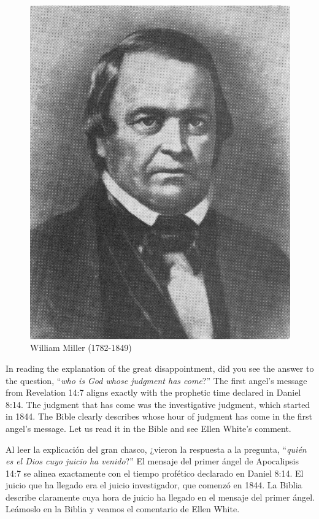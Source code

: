 \begin{figure}[hp]
    \centering
    \includegraphics[width=1\linewidth]{images/william-miller.jpg}
    \caption*{William Miller (1782-1849)}
    \label{fig:w-miller}
\end{figure}


In reading the explanation of the great disappointment, did you see the answer to the question, “\textit{who is God whose judgment has come}?” The first angel’s message from Revelation 14:7 aligns exactly with the prophetic time declared in Daniel 8:14. The judgment that has come was the investigative judgment, which started in 1844. The Bible clearly describes whose hour of judgment has come in the first angel’s message. Let us read it in the Bible and see Ellen White’s comment.


Al leer la explicación del gran chasco, ¿vieron la respuesta a la pregunta, “\textit{quién es el Dios cuyo juicio ha venido}?” El mensaje del primer ángel de Apocalipsis 14:7 se alinea exactamente con el tiempo profético declarado en Daniel 8:14. El juicio que ha llegado era el juicio investigador, que comenzó en 1844. La Biblia describe claramente cuya hora de juicio ha llegado en el mensaje del primer ángel. Leámoslo en la Biblia y veamos el comentario de Ellen White.


